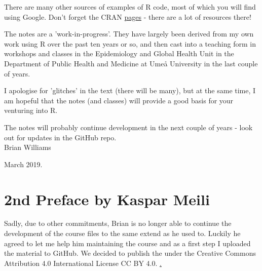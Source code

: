 \documentclass[titlepage]{book}\usepackage{knitr}
\begin{document}
There are many other sources of examples of R code, most of which you will find using Google. Don't forget the CRAN \href{https://cran.r-project.org/}{pages} - there are a lot of resources there! 

The notes are a 'work-in-progress'.  They have largely been derived from my own work using R over the past ten years or so, and then cast into a teaching form in workshops and classes in the Epidemiology and Global Health Unit in the Department of Public Health and Medicine at Umeå University in the last couple of years.

I apologise for 'glitches' in the text (there will be many), but at the same time, I am hopeful that the notes (and classes) will provide a good basis for your venturing into R.

The notes will probably continue development in the next couple of years - look out for updates in the GitHub repo. \\


Brian Williams
 
 
March 2019.


\section{2nd Preface by Kaspar Meili}

Sadly, due to other commitments, Brian is no longer able to continue the development of the course files to the same extend as he used to. Luckily he agreed to let me help him maintaining the course and as a first step I uploaded the material to GitHub. We decided to publish the under the Creative Commons Attribution 4.0 International License CC BY 4.0. \href{https://creativecommons.org/licenses/by/4.0/}. 

\cleardoublepage
{}
{}
\tableofcontents
\cleardoublepage
\mainmatter


\begin{knitrout}
\color{fgcolor}\begin{kframe}
\begin{alltt}
\hlstd{(}\hlstd{)}
 \hlkwb{<-} 
 \hlkwb{<-} 
\end{alltt}
\end{kframe}
\end{knitrout}
\end{document}
